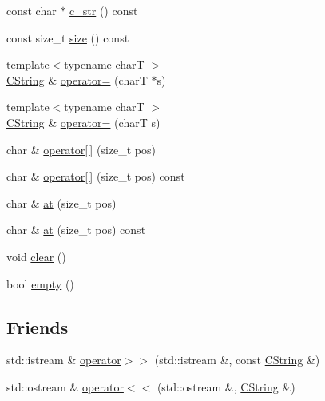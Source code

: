 \begin{DoxyCompactItemize}
\item 
const char $\ast$ \hyperlink{class_triton_1_1_util_1_1_c_string_a48b57cd50721dc8968aacf4a6ac3cb6e}{c\+\_\+str} () const 
\item 
const size\+\_\+t \hyperlink{class_triton_1_1_util_1_1_c_string_ad557f15db25da1ee60ec54db1cfa2239}{size} () const 
\item 
{\footnotesize template$<$typename char\+T $>$ }\\\hyperlink{class_triton_1_1_util_1_1_c_string}{C\+String} \& \hyperlink{class_triton_1_1_util_1_1_c_string_a2d75b9caa4eb2c910c8dbb281e56d5f5}{operator=} (char\+T $\ast$s)
\item 
{\footnotesize template$<$typename char\+T $>$ }\\\hyperlink{class_triton_1_1_util_1_1_c_string}{C\+String} \& \hyperlink{class_triton_1_1_util_1_1_c_string_ac4876a014373694f2c3bc33fd66df5d8}{operator=} (char\+T s)
\item 
char \& \hyperlink{class_triton_1_1_util_1_1_c_string_aea5765384d6881c7b1326d8ece716dbd}{operator\mbox{[}$\,$\mbox{]}} (size\+\_\+t pos)
\item 
char \& \hyperlink{class_triton_1_1_util_1_1_c_string_a6d74b6d9eacb410bed320ec94068b7e8}{operator\mbox{[}$\,$\mbox{]}} (size\+\_\+t pos) const 
\item 
char \& \hyperlink{class_triton_1_1_util_1_1_c_string_ae02e05e16f27d809d29165e0602b2484}{at} (size\+\_\+t pos)
\item 
char \& \hyperlink{class_triton_1_1_util_1_1_c_string_adbb574f452260617f4315d9847476588}{at} (size\+\_\+t pos) const 
\item 
void \hyperlink{class_triton_1_1_util_1_1_c_string_a2736e80001f783256d1cece1970fd6c0}{clear} ()
\item 
bool \hyperlink{class_triton_1_1_util_1_1_c_string_afa3455ac9393a78b5ce5a68f4c0fa9d3}{empty} ()
\end{DoxyCompactItemize}
\subsection*{Friends}
\begin{DoxyCompactItemize}
\item 
std\+::istream \& \hyperlink{class_triton_1_1_util_1_1_c_string_adc6c111687a6434f23a012c206d9ba38}{operator$>$$>$} (std\+::istream \&, const \hyperlink{class_triton_1_1_util_1_1_c_string}{C\+String} \&)
\item 
std\+::ostream \& \hyperlink{class_triton_1_1_util_1_1_c_string_adecb1f467107a740ab54745cca77b09f}{operator$<$$<$} (std\+::ostream \&, \hyperlink{class_triton_1_1_util_1_1_c_string}{C\+String} \&)
\end{DoxyCompactItemize}


